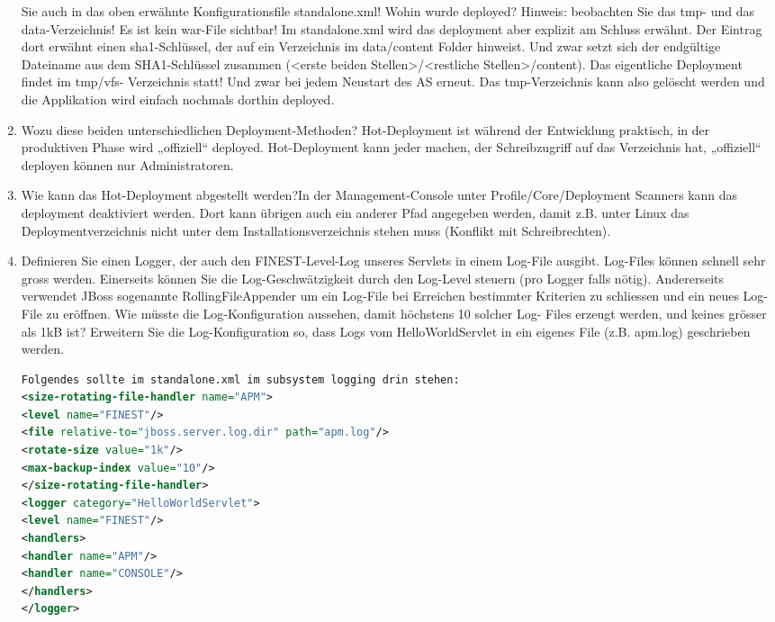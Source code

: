 \documentclass[a4paper,10pt]{scrreprt}
\begin{document}
\begin{enumerate}
Sie auch in das oben erwähnte Konfigurationsfile standalone.xml! Wohin wurde deployed? Hinweis:
beobachten Sie das tmp- und das data-Verzeichnis!
Es ist kein war-File sichtbar! Im standalone.xml wird das deployment aber explizit am Schluss
erwähnt. Der Eintrag dort erwähnt einen sha1-Schlüssel, der auf ein Verzeichnis im data/content
Folder hinweist. Und zwar setzt sich der endgültige Dateiname aus dem SHA1-Schlüssel zusammen
(<erste beiden Stellen>/<restliche Stellen>/content). Das eigentliche Deployment findet im tmp/vfs-
Verzeichnis statt! Und zwar bei jedem Neustart des AS erneut. Das tmp-Verzeichnis kann also
gelöscht werden und die Applikation wird einfach nochmals dorthin deployed.
\item Wozu diese beiden unterschiedlichen Deployment-Methoden?
Hot-Deployment ist während der Entwicklung praktisch, in der produktiven Phase wird „offiziell“
deployed. Hot-Deployment kann jeder machen, der Schreibzugriff auf das Verzeichnis hat, „offiziell“
deployen können nur Administratoren.
\item Wie kann das Hot-Deployment abgestellt werden?In der Management-Console unter
Profile/Core/Deployment Scanners kann das deployment deaktiviert werden. Dort kann übrigen
auch ein anderer Pfad angegeben werden, damit z.B. unter Linux das Deploymentverzeichnis nicht
unter dem Installationsverzeichnis stehen muss (Konflikt mit Schreibrechten).
\item Definieren Sie einen Logger, der auch den FINEST-Level-Log unseres Servlets in einem Log-File
ausgibt.
Log-Files können schnell sehr gross werden. Einerseits können Sie die Log-Geschwätzigkeit durch
den Log-Level steuern (pro Logger falls nötig). Andererseits verwendet JBoss sogenannte
RollingFileAppender um ein Log-File bei Erreichen bestimmter Kriterien zu schliessen und ein neues
Log-File zu eröffnen. Wie müsste die Log-Konfiguration aussehen, damit höchstens 10 solcher Log-
Files erzeugt werden, und keines grösser als 1kB ist?
Erweitern Sie die Log-Konfiguration so, dass Logs vom HelloWorldServlet in ein eigenes File (z.B.
apm.log) geschrieben werden.
\begin{lstlisting}[caption=wildlfly log config,language=xml]
Folgendes sollte im standalone.xml im subsystem logging drin stehen:
<size-rotating-file-handler name="APM">
<level name="FINEST"/>
<file relative-to="jboss.server.log.dir" path="apm.log"/>
<rotate-size value="1k"/>
<max-backup-index value="10"/>
</size-rotating-file-handler>
<logger category="HelloWorldServlet">
<level name="FINEST"/>
<handlers>
<handler name="APM"/>
<handler name="CONSOLE"/>
</handlers>
</logger>
\end{lstlisting}

\end{enumerate}
\end{document}
